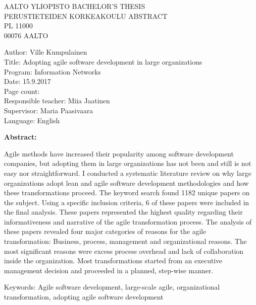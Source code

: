 
\begin{flushleft}
AALTO YLIOPISTO \hfill BACHELOR'S THESIS \\
PERUSTIETEIDEN KORKEAKOULU \hfill ABSTRACT \\
PL 11000 \\
00076 AALTO \\
\end{flushleft}

\begin{minipage}{15cm}
\begin{framed}
    Author: Ville Kumpulainen \\
    Title: Adopting agile software development in large organizations \\
    Program: Information Networks \\
    Date: 15.9.2017 \\
        Page count:~\pageref{LastPage} \\
        Responsible teacher: Miia Jaatinen \\
        Supervisor: Maria Paasivaara \\
        Language: English
\end{framed}
\end{minipage}

\bigskip

{\large\bfseries Abstract: \par} Agile methods have increased their
popularity among software development companies, but adopting them
in large organizations has not been and still is not easy nor
straightforward. I conducted a systematic literature review on why large
organizations adopt lean and agile software development methodologies
and how these transformations proceed. The keyword search found 1182
unique papers on the subject. Using a specific inclusion criteria,
6 of these papers were included in the final analysis. These papers
represented the highest quality regarding their informativeness
and narrative of the agile transformation process. The analysis of
these papers revealed four major categories of reasons for the agile
transformation: Business, process, management and organizational
reasons. The most significant reasons were excess process overhead and
lack of collaboration inside the organization. Most transformations
started from an executive management decision and proceeded in a
planned, step-wise manner.

\medskip

\begin{minipage}{15cm}
\begin{framed}
        Keywords: Agile software development, large-scale agile, organizational
        transformation, adopting agile software development
\end{framed}
\end{minipage}

